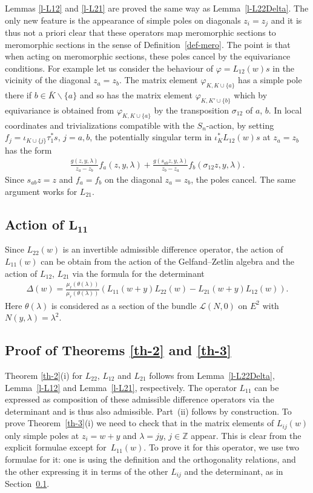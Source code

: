 \documentclass[10pt,a4paper]{amsart}
\numberwithin{equation}{section}
\begin{document}
Lemmas \ref{l-L12} and \ref{l-L21} are proved the same way as Lemma~\ref{l-L22Delta}. The only new feature is the appearance of simple poles on diagonals $z_i=z_j$ and it is thus not a priori clear that these operators map meromorphic sections to meromorphic sections in the sense of Definition~\ref{def-mero}. The point is that when acting on meromorphic sections, these poles cancel by the equivariance conditions. For example let us consider the behaviour of $\varphi=L_{12}(w)s$ in the vicinity of the diagonal $z_a=z_b$. The matrix element $\varphi_{K,K\cup\{a\}}$ has a simple pole there if $b\in \bar K\smallsetminus\{a\}$ and so has the matrix element $\varphi_{K,K'\cup\{b\}}$ which by equivariance is obtained from $\varphi_{K,K\cup\{a\}}$ by the transposition $\sigma_{12}$ of $a$, $b$. In local coordinates and trivializations compatible with the $S_n$-action, by setting $f_j=\iota_{K\cup\{j\}}\tau^*_1s$, $j=a,b$, the potentially singular term in $\iota_K^*L_{12}(w)s$ at $z_a=z_b$ has the form
\begin{gather*}
 \frac {g(z,y,\lambda)}{z_a-z_b}f_a(z,y,\lambda) +\frac{g(s_{ab}z,y,\lambda)}{z_b-z_a}f_b(\sigma_{12}z,y,\lambda).
\end{gather*}
Since $s_{ab}z=z$ and $f_a=f_b$ on the diagonal $z_a=z_b$, the poles cancel. The same argument works for $L_{21}$.

\subsection[Action of $L_{11}$]{Action of $\boldsymbol{L_{11}}$}\label{ss-6.3}
Since $L_{22}(w)$ is an invertible admissible difference operator, the action of $L_{11}(w)$ can be obtain from the action of the Gelfand--Zetlin algebra and the action of $L_{12}$, $L_{21}$ via the formula for the determinant
\begin{gather}\label{e-determinant}
 \Delta(w)=\frac{\mu_\ell(\theta(\lambda))}{\mu_r(\theta(\lambda))} (L_{11}(w+y)L_{22}(w)-L_{21}(w+y)L_{12}(w)).
\end{gather} Here $\theta(\lambda)$ is considered as a section of the bundle $\mathcal L(N,0)$ on $E^2$ with $N(y,\lambda)=\lambda^2$.

\subsection{Proof of Theorems \ref{th-2} and \ref{th-3}}\label{ss-6.4}
Theorem \ref{th-2}(i) for $L_{22}$, $L_{12}$ and $L_{21}$ follows from Lemma~\ref{l-L22Delta}, Lemma~\ref{l-L12} and Lemma~\ref{l-L21}, respectively. The operator $L_{11}$ can be expressed as composition of these admissible difference operators via the determinant and is thus also admissible. Part~(ii) follows by construction. To prove Theorem~\ref{th-3}(i) we need to check that in the matrix elements of $L_{ij}(w)$ only simple poles at $z_i=w+y$ and $\lambda=jy$, $j\in\mathbb Z$ appear. This is clear from the explicit formulae except for~$L_{11}(w)$. To prove it for this operator, we use two formulae for it: one is using the definition and the orthogonality relations, and the other expressing it in terms of the other $L_{ij}$ and the determinant, as in Section~\ref{ss-6.3}.
\end{document}
